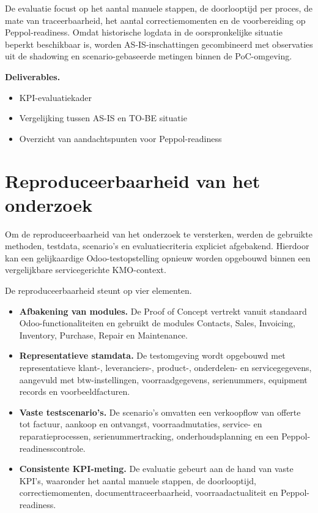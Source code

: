 De evaluatie focust op het aantal manuele stappen, de doorlooptijd per proces, de mate van traceerbaarheid, het aantal correctiemomenten en de voorbereiding op Peppol-readiness. Omdat historische logdata in de oorspronkelijke situatie beperkt beschikbaar is, worden AS-IS-inschattingen gecombineerd met observaties uit de shadowing en scenario-gebaseerde metingen binnen de PoC-omgeving.

\textbf{Deliverables.}
\begin{itemize}
    \item KPI-evaluatiekader
    \item Vergelijking tussen AS-IS en TO-BE situatie
    \item Overzicht van aandachtspunten voor Peppol-readiness
\end{itemize}

\section{Reproduceerbaarheid van het onderzoek}
\label{sec:reproduceerbaarheid}

Om de reproduceerbaarheid van het onderzoek te versterken, werden de gebruikte methoden, testdata, scenario’s en evaluatiecriteria expliciet afgebakend. Hierdoor kan een gelijkaardige Odoo-testopstelling opnieuw worden opgebouwd binnen een vergelijkbare servicegerichte KMO-context.

De reproduceerbaarheid steunt op vier elementen.

\begin{itemize}
    \item \textbf{Afbakening van modules.} De Proof of Concept vertrekt vanuit standaard Odoo-functionaliteiten en gebruikt de modules Contacts, Sales, Invoicing, Inventory, Purchase, Repair en Maintenance.
    \item \textbf{Representatieve stamdata.} De testomgeving wordt opgebouwd met representatieve klant-, leveranciers-, product-, onderdelen- en servicegegevens, aangevuld met btw-instellingen, voorraadgegevens, serienummers, equipment records en voorbeeldfacturen.
    \item \textbf{Vaste testscenario’s.} De scenario’s omvatten een verkoopflow van offerte tot factuur, aankoop en ontvangst, voorraadmutaties, service- en reparatieprocessen, serienummertracking, onderhoudsplanning en een Peppol-readinesscontrole.
    \item \textbf{Consistente KPI-meting.} De evaluatie gebeurt aan de hand van vaste KPI’s, waaronder het aantal manuele stappen, de doorlooptijd, correctiemomenten, documenttraceerbaarheid, voorraadactualiteit en Peppol-readiness.
\end{itemize}

